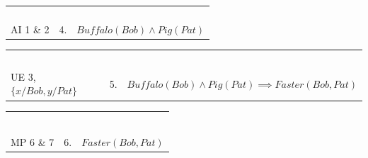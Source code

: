 \documentclass[fleqn]{article}
\begin{document}
\begin{huge}

\begin{tabular}{l|ll}
\phantom{Bob là một con trâu} &  & \\
\phantom{UE 3, $\{x/Bob,y/Pat\}$} & &  \\
\phantom{Trâu chạy nhanh hơn lợn} & & \\
\hline
\phantom{Bob chạy nhanh hơn Pat} & & \phantom{$Buffalo(Bob) \land Pig(Pat) \implies Faster(Bob,Pat)$}\\
\hline
AI 1 \& 2 & 4. & $Buffalo(Bob) \land Pig(Pat)$ \\
\end{tabular}




\begin{tabular}{l|ll}
\phantom{Bob là một con trâu} &  & \\
\phantom{Pat là một con lợn} & &  \\
\phantom{Trâu chạy nhanh hơn lợn} & & \\
\hline
\phantom{Bob chạy nhanh hơn Pat} & & \phantom{$Buffalo(Bob) \land Pig(Pat) \implies Faster(Bob,Pat)$}\\
\hline
\phantom{AI 1 \& 2} & & \\
UE 3, $\{x/Bob,y/Pat\}$ & 5. & $Buffalo(Bob) \land Pig(Pat) \implies Faster(Bob,Pat)$\\
\end{tabular}


\begin{tabular}{l|ll}
\phantom{Bob là một con trâu} &  & \\
\phantom{Pat là một con lợn} & &  \\
\phantom{Trâu chạy nhanh hơn lợn} & & \\
\hline
\phantom{Bob chạy nhanh hơn Pat} & & \phantom{$Buffalo(Bob) \land Pig(Pat) \implies Faster(Bob,Pat)$} \\
\hline
\phantom{AI 1 \& 2} & & \\
\phantom{UE 3, $\{x/Bob,y/Pat\}$} & & \\
MP 6 \& 7 & 6. & $Faster(Bob,Pat)$ \\
\end{tabular}



\end{huge}
\end{document}
